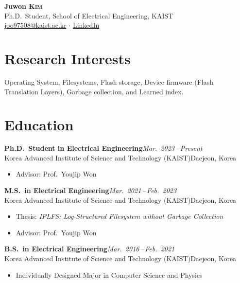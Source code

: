 \documentclass[11pt,a4paper]{article}
\newcommand{\entry}[4]{%
  \noindent\textbf{#1}\hfill\textit{#2}\\
  #3\hfill#4\par\vspace{4pt}}
\begin{document}
\begin{center}
  {\LARGE\bfseries Juwon \textsc{Kim}}\\[6pt]
  \small
  Ph.D.\ Student, School of Electrical Engineering, KAIST \\[2pt]
  \href{mailto:joo97508@kaist.ac.kr}{joo97508@kaist.ac.kr} \quad$\cdot$\quad
  \href{https://www.linkedin.com/in/juwon-kim-583060206}{LinkedIn}
\end{center}

\section{Research Interests}
Operating System, 
Filesystems,
Flash storage,
Device firmware (Flash Translation Layers),
Garbage collection, 
and Learned index. 

\section{Education}

\entry{Ph.D.\ Student in Electrical Engineering}{Mar.\ 2023\,--\,Present}
{Korea Advanced Institute of Science and Technology (KAIST)}{Daejeon, Korea}
\begin{itemize}[leftmargin=1.2em, nosep, topsep=2pt]
  \item Advisor: Prof.\ Youjip Won
\end{itemize}
\vspace{4pt}

\entry{M.S.\ in Electrical Engineering}{Mar.\ 2021\,--\,Feb.\ 2023}
{Korea Advanced Institute of Science and Technology (KAIST)}{Daejeon, Korea}
\begin{itemize}[leftmargin=1.2em, nosep, topsep=2pt]
  \item Thesis: \textit{IPLFS: Log-Structured Filesystem without Garbage Collection}
  \item Advisor: Prof.\ Youjip Won 
\end{itemize}
\vspace{4pt}

\entry{B.S.\ in Electrical Engineering}{Mar.\ 2016\,--\,Feb.\ 2021}
{Korea Advanced Institute of Science and Technology (KAIST)}{Daejeon, Korea}
\begin{itemize}[leftmargin=1.2em, nosep, topsep=2pt]
  \item Individually Designed Major in Computer Science and Physics
\end{itemize}
\end{document}

